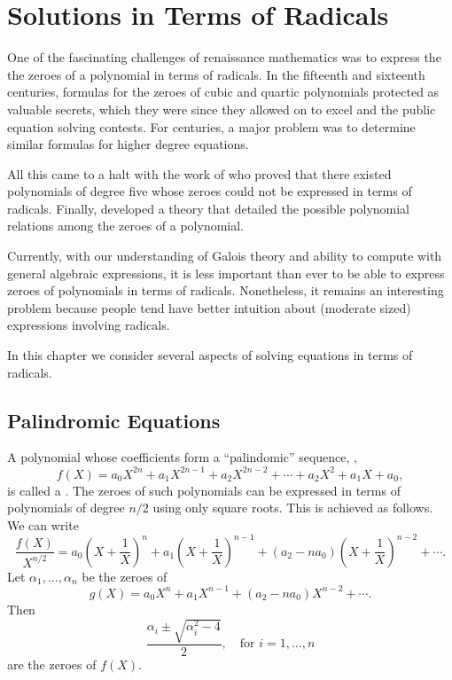 \chapter{Solutions in Terms of Radicals}
\label{Radical:Soln:Chap}

One of the fascinating challenges of renaissance mathematics was to
express the the zeroes of a polynomial in terms of radicals.  In the
fifteenth and sixteenth centuries, formulas for the zeroes of cubic
and quartic polynomials protected as valuable secrets, which they were
since they allowed on to excel and the public equation solving
contests.  For centuries, a major problem was to determine similar
formulas for higher degree equations.

All this came to a halt with the work of {\Abel} \cite{Abel26} who
proved that there existed polynomials of degree five whose zeroes
could not be expressed in terms of radicals.  Finally, {\Galois}
\cite{Galois62} developed a theory that detailed the possible polynomial
relations among the zeroes of a polynomial.  

Currently, with our understanding of Galois theory and ability to
compute with general algebraic expressions, it is less important than
ever to be able to express zeroes of polynomials in terms of radicals.
Nonetheless, it remains an interesting problem because people tend
have better intuition about (moderate sized) expressions involving
radicals.

In this chapter we consider several aspects of solving equations in
terms of radicals.

\section{Palindromic Equations}
\label{Palindrome:Eq}

A polynomial whose coefficients form a ``palindomic'' sequence, \ie, 
\[
f(X) = a_0 X^{2n} + a_1 X^{2n-1} + a_2 X^{2n-2} + \cdots +
a_2 X^2 + a_1 X + a_0,
\]
is called a .  The zeroes of such
polynomials can be expressed in terms of polynomials of degree $n/2$
using only square roots.  This is achieved as follows.  We can write
\[
\frac{f(X)}{X^{n/2}} = a_0 \left(X + \frac{1}{X}\right)^{n} 
  + a_1 \left(X + \frac{1}{X}\right)^{n-1}  
  + (a_2 - n a_0) \left(X + \frac{1}{X}\right)^{n-2} + \cdots.
\]
Let $\alpha_1, \ldots, \alpha_n$ be the zeroes of
\[
g(X) = a_0 X^n + a_1 X^{n-1} + (a_2 - n a_0) X^{n-2} + \cdots .
\]
Then 
\[
\frac{\alpha_i \pm \sqrt{\alpha_i^2 -4}}{2}, \quad \mbox{for $i =
1,\ldots, n$}
\]
are the zeroes of $f(X)$.

